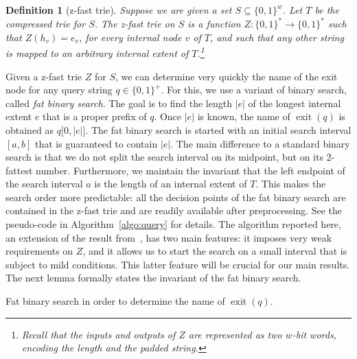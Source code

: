 \documentclass[a4paper,11pt]{article}
\newtheorem{definition}[theorem]{Definition}
\newcommand{\eps}{\varepsilon}
\newcommand{\?}{\mskip1.5mu}
\DeclareMathOperator{\exit}{exit}
\begin{document}
\begin{definition}[z-fast trie]
Suppose we are given a set $S \subseteq \{0, 1\}^w$. Let $T$ be the 
compressed trie for $S$. The \emph{z-fast trie on $S$} is 
a function $Z : \{0, 1\}^* \rightarrow \{0, 1\}^*$ such that 
$Z(h_v) = e_v$, for every internal node $v$ of $T$, and such
that any other string is mapped to an arbitrary internal extent
of $T$.\footnote{Recall that the inputs and outputs of $Z$
are represented as two $w$-bit words, encoding the length
and the padded string.}
\end{definition}

Given a z-fast trie $Z$ for $S$, we can determine very 
quickly the name of the exit node for any query string $q \in \{0,1\}^+$.
For this, we use a variant of binary search, called 
\emph{fat binary search}.
The goal is to find the length $|e|$ of the 
longest internal extent $e$ that is a proper 
prefix of $q$. Once $|e|$ is known, the name 
of $\exit(q)$ is obtained as $q\big[0, |e|\big]$.
The fat binary search is started with an initial
search interval $[a,b]$ that is guaranteed
to contain $|e|$. The main difference to
a standard binary search is that we do
not split the search interval on its
midpoint, but on its 2-fattest number.
Furthermore, we maintain the invariant
that the left endpoint of the search interval $a$ 
is the length of an internal extent
of $T$.  This makes the search order more
predictable: all the decision points of the
fat binary search are contained in the z-fast trie
and are readily available after preprocessing.
See the pseudo-code in Algorithm~\ref{algo:query} for details. 
The algorithm reported here, an extension of the 
result from~\cite{BelazzouguiBoVi10}, has two main features:
it imposes very weak requirements on $Z$, and it allows us to start 
the search on a small interval that is subject to
mild conditions. This latter feature will be crucial 
for our main results. The next lemma formally states
the invariant of the fat binary search.

\begin{algorithm}
\KwOut{the name of $\exit(q)$}
\If{$a = 0 \wedge e_\text{root}\neq\eps$}{%
  \Return $\eps$\;
} 
\caption{Fat binary search in order to 
  determine the name of $\exit(q)$.}
\label{algo:query}
\end{algorithm}
\end{document}
